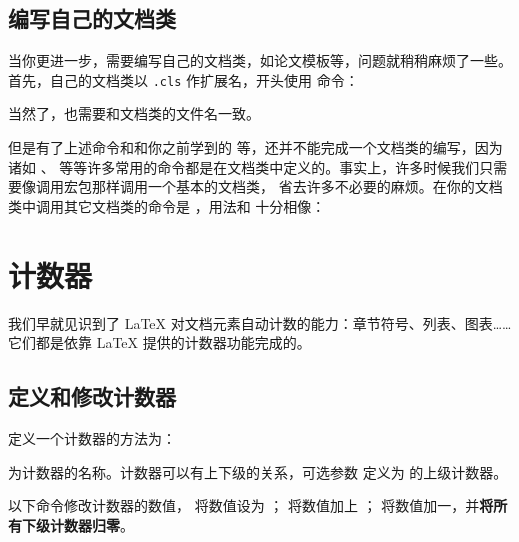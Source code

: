 \subsection{编写自己的文档类}\label{subsec:provide-cls}

当你更进一步，需要编写自己的文档类，如论文模板等，问题就稍稍麻烦了一些。首先，自己的文档类以 \texttt{.cls} 作扩展名，开头使用
 命令：
\begin{command}
\end{command}
当然了，也需要和文档类的文件名一致。

但是有了上述命令和和你之前学到的  等，还并不能完成一个文档类的编写，因为诸如 、
 等等许多常用的命令都是在文档类中定义的。事实上，许多时候我们只需要像调用宏包那样调用一个基本的文档类，
省去许多不必要的麻烦。在你的文档类中调用其它文档类的命令是 ，用法和  十分相像：
\begin{command}
\end{command}

\section{计数器}\label{sec:counters}

我们早就见识到了 \LaTeX{} 对文档元素自动计数的能力：章节符号、列表、图表……它们都是依靠 \LaTeX{} 提供的计数器功能完成的。

\subsection{定义和修改计数器}\label{subsec:count-defs}

定义一个计数器的方法为：
\begin{command}
\end{command}

 为计数器的名称。计数器可以有上下级的关系，可选参数  定义为  的上级计数器。

以下命令修改计数器的数值， 将数值设为 ； 将数值加上 ；
 将数值加一，并\textbf{将所有下级计数器归零}。
\begin{command}
 \\
 \\
\end{command}

